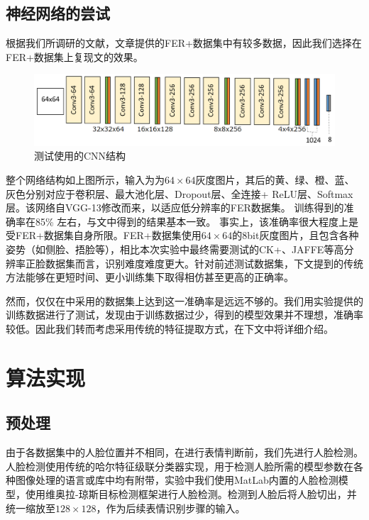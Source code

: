 \documentclass[UTF8]{ctexart}
\begin{document}
\subsection{神经网络的尝试}
根据我们所调研的文献，文章\cite{BarsoumICMI2016}提供的FER+数据集中有较多数据，因此我们选择在FER+数据集上复现文\cite{BarsoumICMI2016}的效果。

\begin{figure}[ht]
  \centering
  \includegraphics[width=\textwidth]{ferplus.png}
  \caption{测试使用的CNN结构}\label{fig:ferplus}
\end{figure}

整个网络结构如上图所示，输入为为$64\times 64$灰度图片，其后的黄、绿、橙、蓝、灰色分别对应于卷积层、最大池化层、Dropout层、全连接+ ReLU层、Softmax层。该网络自VGG-13修改而来，以适应低分辨率的FER数据集。
训练得到的准确率在85\% 左右，与文中得到的结果基本一致。
事实上，该准确率很大程度上是受FER+数据集自身所限。FER+数据集使用$64\times 64$的8bit灰度图片，且包含各种姿势（如侧脸、捂脸等），相比本次实验中最终需要测试的CK+、JAFFE等高分辨率正脸数据集而言，识别难度难度更大。针对前述测试数据集，下文提到的传统方法能够在更短时间、更小训练集下取得相仿甚至更高的正确率。

然而，仅仅在\cite{BarsoumICMI2016}中采用的数据集上达到这一准确率是远远不够的。我们用实验提供的训练数据进行了测试，发现由于训练数据过少，得到的模型效果并不理想，准确率较低。因此我们转而考虑采用传统的特征提取方式，在下文中将详细介绍。

\section{算法实现}

\subsection{预处理}

由于各数据集中的人脸位置并不相同，在进行表情判断前，我们先进行人脸检测。人脸检测使用传统的哈尔特征级联分类器实现，用于检测人脸所需的模型参数在各种图像处理的语言或库中均有附带，实验中我们使用MatLab内置的人脸检测模型，使用维奥拉-琼斯目标检测框架进行人脸检测。检测到人脸后将人脸切出，并统一缩放至$128\times 128$，作为后续表情识别步骤的输入。
\end{document}
